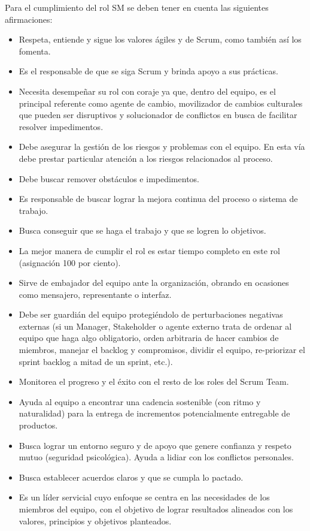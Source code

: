 Para el cumplimiento del rol SM se deben tener en cuenta las siguientes afirmaciones:

\begin{itemize}
\item Respeta, entiende y sigue los valores ágiles y de Scrum, como también así los fomenta.
\item Es el responsable de que se siga Scrum y brinda apoyo a sus prácticas.
\item Necesita desempeñar su rol con coraje ya que, dentro del equipo, es el principal referente como agente de cambio, movilizador de cambios culturales que pueden ser disruptivos y solucionador de conflictos en busca de facilitar resolver impedimentos.
\item Debe asegurar la gestión de los riesgos y problemas con el equipo. En esta vía debe prestar particular atención a los riesgos relacionados al proceso.
\item Debe buscar remover obstáculos e impedimentos.
\item Es responsable de buscar lograr la mejora continua del proceso o sistema de trabajo.
\item Busca conseguir que se haga el trabajo y que se logren lo objetivos.
\item La mejor manera de cumplir el rol es estar tiempo completo en este rol (asignación 100 por ciento).
\item Sirve de embajador del equipo ante la organización, obrando en ocasiones como mensajero, representante o interfaz.
\item Debe ser guardián del equipo protegiéndolo de perturbaciones negativas externas (si un Manager, Stakeholder o agente externo trata de ordenar al equipo que haga algo obligatorio, orden arbitraria de hacer cambios de miembros, manejar el backlog y compromisos, dividir el equipo, re-priorizar el sprint backlog a mitad de un sprint, etc.).
\item Monitorea el progreso y el éxito con el resto de los roles del Scrum Team.
\item Ayuda al equipo a encontrar una cadencia sostenible (con ritmo y naturalidad) para la entrega de incrementos potencialmente entregable de productos. 
\item Busca lograr un entorno seguro y de apoyo que genere confianza y respeto mutuo (seguridad psicológica). Ayuda a lidiar con los conflictos personales.
\item Busca establecer acuerdos claros y que se cumpla lo pactado.
\item Es un líder servicial cuyo enfoque se centra en las necesidades de los miembros del equipo, con el objetivo de lograr resultados alineados con los valores, principios y objetivos planteados.

\end{itemize}
